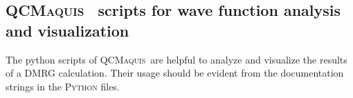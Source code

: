 \documentclass[bibliography=totoc,12pt,a4paper]{scrartcl}
\newcommand{\qcm}{\textsc{QCMaquis}}
\begin{document}
\subsection{\qcm\  scripts for wave function analysis and visualization}\label{sec:pytools-qcm}

The python scripts of \qcm\ are helpful to analyze and visualize the results of a DMRG calculation. Their usage should be evident from the documentation strings in the \textsc{Python} files.
\end{document}
